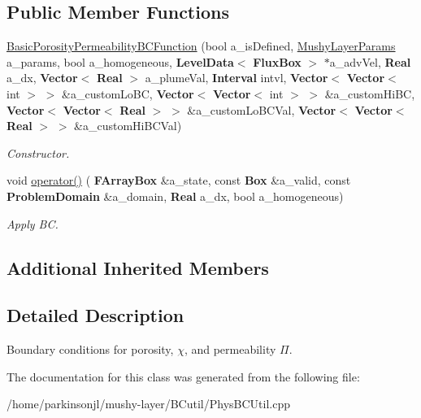 \subsection*{Public Member Functions}
\begin{DoxyCompactItemize}
\item 
\mbox{\label{class_basic_porosity_permeability_b_c_function_a0b9bf045ea7a47fee8064ca8a0437eee}} 
\hyperlink{class_basic_porosity_permeability_b_c_function_a0b9bf045ea7a47fee8064ca8a0437eee}{Basic\+Porosity\+Permeability\+B\+C\+Function} (bool a\+\_\+is\+Defined, \hyperlink{class_mushy_layer_params}{Mushy\+Layer\+Params} a\+\_\+params, bool a\+\_\+homogeneous, \textbf{ Level\+Data}$<$ \textbf{ Flux\+Box} $>$ $\ast$a\+\_\+adv\+Vel, \textbf{ Real} a\+\_\+dx, \textbf{ Vector}$<$ \textbf{ Real} $>$ a\+\_\+plume\+Val, \textbf{ Interval} intvl, \textbf{ Vector}$<$ \textbf{ Vector}$<$ int $>$ $>$ \&a\+\_\+custom\+Lo\+BC, \textbf{ Vector}$<$ \textbf{ Vector}$<$ int $>$ $>$ \&a\+\_\+custom\+Hi\+BC, \textbf{ Vector}$<$ \textbf{ Vector}$<$ \textbf{ Real} $>$ $>$ \&a\+\_\+custom\+Lo\+B\+C\+Val, \textbf{ Vector}$<$ \textbf{ Vector}$<$ \textbf{ Real} $>$ $>$ \&a\+\_\+custom\+Hi\+B\+C\+Val)
\begin{DoxyCompactList}\small\item\em Constructor. \end{DoxyCompactList}\item 
\mbox{\label{class_basic_porosity_permeability_b_c_function_a436d10317f86cbf27980f1b3a694386a}} 
void \hyperlink{class_basic_porosity_permeability_b_c_function_a436d10317f86cbf27980f1b3a694386a}{operator()} (\textbf{ F\+Array\+Box} \&a\+\_\+state, const \textbf{ Box} \&a\+\_\+valid, const \textbf{ Problem\+Domain} \&a\+\_\+domain, \textbf{ Real} a\+\_\+dx, bool a\+\_\+homogeneous)
\begin{DoxyCompactList}\small\item\em Apply BC. \end{DoxyCompactList}\end{DoxyCompactItemize}
\subsection*{Additional Inherited Members}


\subsection{Detailed Description}
Boundary conditions for porosity, $ \chi $, and permeability $\Pi$. 

The documentation for this class was generated from the following file\+:\begin{DoxyCompactItemize}
\item 
/home/parkinsonjl/mushy-\/layer/\+B\+Cutil/Phys\+B\+C\+Util.\+cpp\end{DoxyCompactItemize}
